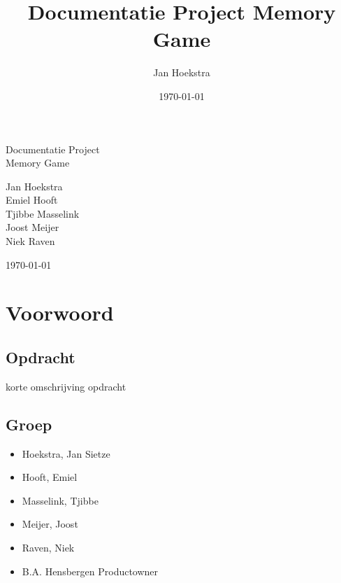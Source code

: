 \documentclass[a4paper,titlepage,11pt]{article}
\title{Documentatie Project Memory Game}
\date{\today}
\author{Jan Hoekstra}
\def\myauthor{Jan Hoekstra}
\def\mytitle{Documentatie Project} %
\def\mysubtitle{Memory Game}
\def\mydate{\today} %
\def\mycoauthors{
Emiel Hooft \\
Tjibbe Masselink \\
Joost Meijer \\
Niek Raven
}
\begin{document}

\begin{titlepage}
\vspace{5cm}

\centering
\vspace*{\fill}
\parbox[c][5cm][t]{10cm}{
  \color{white}\Huge\centering

  \mytitle \\
  \mysubtitle
  
  \vspace{3cm}
\huge
  \myauthor \\
  \mycoauthors
  
  \vspace{3cm}

  \mydate
}
\vspace*{\fill}

\end{titlepage}
\tableofcontents
\clearpage
{}

\section{Voorwoord}

\subsection{Opdracht}

korte omschrijving opdracht

\subsection{Groep}

\begin{itemize}
\item Hoekstra, Jan Sietze
\item Hooft, Emiel
\item Masselink, Tjibbe
\item Meijer, Joost
\item Raven, Niek
\item B.A. Hensbergen \- Productowner
\end{itemize}

\clearpage
\end{document}
